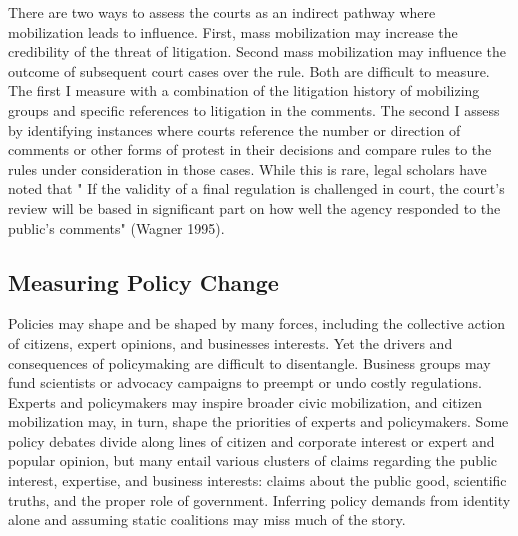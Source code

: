 There are two ways to assess the courts as an indirect pathway where mobilization leads to influence. First, mass mobilization may increase the credibility of the threat of litigation. Second mass mobilization may influence the outcome of subsequent court cases over the rule. Both are difficult to measure. The first I measure with a combination of the litigation history of mobilizing groups and specific references to litigation in the comments. The second I assess by identifying instances where courts reference the number or direction of comments or other forms of protest in their decisions and compare rules to the rules under consideration in those cases. While this is rare, legal scholars have noted that " If the validity of a final regulation is challenged in court, the court's review will be based in significant part on how well the agency responded to the public's comments"  (Wagner 1995).

\subsection{Measuring Policy Change}
Policies may shape and be shaped by many forces, including the collective action of citizens, expert opinions, and businesses interests. Yet the drivers and consequences of policymaking are difficult to disentangle. Business groups may fund scientists or advocacy campaigns to preempt or undo costly regulations. Experts and policymakers may inspire broader civic mobilization, and citizen mobilization may, in turn, shape the priorities of experts and policymakers. Some policy debates divide along lines of citizen and corporate interest or expert and popular opinion, but many entail various clusters of claims regarding the public interest, expertise, and business interests: claims about the public good, scientific truths, and the proper role of government. Inferring policy demands from identity alone and assuming static coalitions may miss much of the story. 




